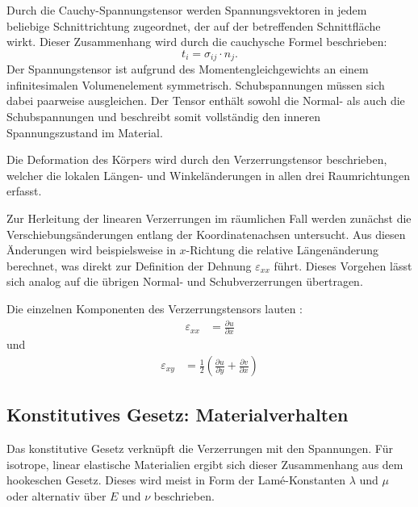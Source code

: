 Durch die Cauchy-Spannungstensor werden Spannungsvektoren in jedem beliebige Schnittrichtung zugeordnet, der auf der betreffenden Schnittfläche wirkt.
Dieser Zusammenhang wird durch die cauchysche Formel beschrieben:
\begin{equation}
	t_i = 
	\sigma_{ij} \cdot n_j.
\end{equation}
Der Spannungstensor ist aufgrund des Momentengleichgewichts an einem infinitesimalen Volumenelement symmetrisch. Schubspannungen müssen sich dabei paarweise ausgleichen. 
Der Tensor enthält sowohl die Normal- als auch die Schubspannungen und beschreibt somit vollständig den inneren Spannungszustand im Material.

Die Deformation des Körpers wird durch den Verzerrungstensor beschrieben, welcher die lokalen Längen- und Winkeländerungen in allen drei Raumrichtungen erfasst.

Zur Herleitung der linearen Verzerrungen im räumlichen Fall werden zunächst die Verschiebungsänderungen entlang der Koordinatenachsen untersucht. 
Aus diesen Änderungen wird beispielsweise in $x$-Richtung die relative Längenänderung berechnet, was direkt zur Definition der Dehnung $\varepsilon_{xx}$ führt. 
Dieses Vorgehen lässt sich analog auf die übrigen Normal- und Schubverzerrungen übertragen.

Die einzelnen Komponenten des Verzerrungstensors lauten \cite{elastomechanik:Technische_Mechanik_2:Elastostatik}:
\begin{align}
	\varepsilon_{xx} &=
	\frac{\partial u}{\partial x}
\end{align}
und
\begin{align}
	\varepsilon_{xy} &=
	\frac{1}{2} \left( \frac{\partial u}{\partial y} + \frac{\partial v}{\partial x} \right)
\end{align}


\subsection{Konstitutives Gesetz: Materialverhalten}

Das konstitutive Gesetz verknüpft die Verzerrungen mit den Spannungen. Für isotrope, linear elastische Materialien ergibt sich dieser Zusammenhang aus dem hookeschen Gesetz. Dieses wird meist in Form der Lamé-Konstanten $\lambda$ und $\mu$ oder alternativ über $E$ und $\nu$ beschrieben.


